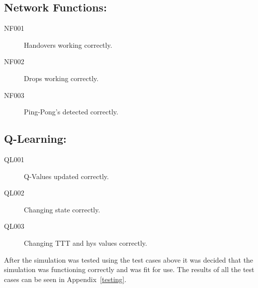 \subsection*{Network Functions:}
\begin{description}
\item[NF001]	Handovers working correctly.
\item[NF002]	Drops working correctly.
\item[NF003]	Ping-Pong's detected correctly.
\end{description}
\subsection*{Q-Learning:}
\begin{description}
\item[QL001]	Q-Values updated correctly.
\item[QL002]	Changing state correctly.
\item[QL003]	Changing TTT and hys values correctly.
\end{description}
After the simulation was tested using the test cases above it was decided that the simulation was functioning correctly and was fit for use. The results of all the test cases can be seen in Appendix~\ref{testing}.
